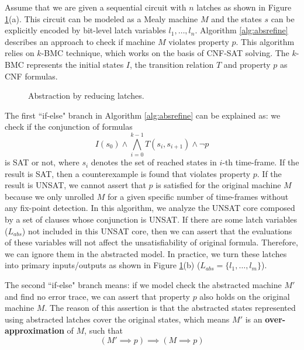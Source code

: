Assume that we are given a sequential circuit with $n$ latches as shown in Figure \ref{fig:absrefine}(a). 
This circuit can be modeled as a Mealy machine $M$ and the states $s$ can be explicitly encoded by bit-level latch variables 
$l_1,\dots,l_n$. Algorithm \ref{alg:absrefine} describes an approach to check if machine $M$ violates property $p$.
This algorithm relies on $k$-BMC technique, which works on the basis of CNF-SAT solving.
The $k$-BMC represents the initial states $I$, the transition relation $T$ and property $p$ as CNF formulas.

\begin{figure}[bp]
\caption{Abstraction by reducing latches.}
\label{fig:absrefine}
\end{figure}

The first ``if-else" branch in Algorithm \ref{alg:absrefine} can be
explained as: we check if the conjunction of formulas 
$$I(s_0)\land \bigwedge_{i=0}^{k-1}T(s_i,s_{i+1}) \land \neg p$$
is SAT or not, where $s_i$ denotes the set of reached states in $i$-th time-frame. If the result is
SAT, then a counterexample is found that violates property $p$. If the result is UNSAT, we cannot
assert that $p$ is satisfied for the original machine $M$ because we only unrolled $M$ for a given specific number of time-frames
without any fix-point detection.
In this algorithm, we analyze the UNSAT core composed by a set of clauses whose conjunction is UNSAT.
If there are some latch variables ($L_{abs}$) not included in this UNSAT core, then we can assert that the evaluations of 
these variables will not affect the unsatisfiability of original formula. Therefore, we can ignore them in the abstracted model.
In practice, we turn these latches into primary inputs/outputs as shown in Figure \ref{fig:absrefine}(b) ($L_{abs} = \{l_1,\dots,l_m\}$).


The second ``if-else" branch means: if we model check the abstracted machine $M'$ and find no
error trace, we can assert that property $p$ also holds on the original machine $M$. The reason of this assertion is that
the abstracted states represented using abstracted latches cover the original states, which means $M'$ is an {\bf over-approximation}
of $M$, such that 
$$(M'\implies p) \implies (M\implies p)$$ 

